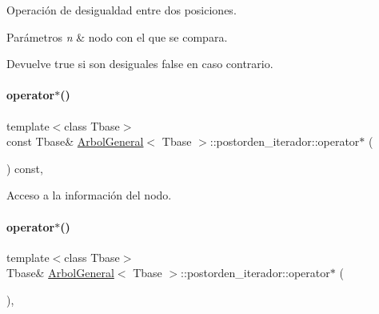 Operación de desigualdad entre dos posiciones. 


\begin{DoxyParams}{Parámetros}
{\em n} & nodo con el que se compara. \\
\hline
\end{DoxyParams}
\begin{DoxyReturn}{Devuelve}
true si son desiguales false en caso contrario. 
\end{DoxyReturn}
\hypertarget{classArbolGeneral_1_1postorden__iterador_aa42543b192361b8ea90e115a0ed99cab}{}\label{classArbolGeneral_1_1postorden__iterador_aa42543b192361b8ea90e115a0ed99cab} 
\paragraph{\texorpdfstring{operator$\ast$()}{operator*()}\hspace{0.1cm}{\footnotesize\ttfamily [1/2]}}
{\footnotesize\ttfamily template$<$class Tbase$>$ \\
const Tbase\& \hyperlink{classArbolGeneral}{Arbol\+General}$<$ Tbase $>$\+::postorden\+\_\+iterador\+::operator$\ast$ (\begin{DoxyParamCaption}{ }\end{DoxyParamCaption}) const\hspace{0.3cm}{\ttfamily [inline]}, {\ttfamily [private]}}



Acceso a la información del nodo. 

\hypertarget{classArbolGeneral_1_1postorden__iterador_af0f0fcc363dd30b5b0d102c1b60817c3}{}\label{classArbolGeneral_1_1postorden__iterador_af0f0fcc363dd30b5b0d102c1b60817c3} 
\paragraph{\texorpdfstring{operator$\ast$()}{operator*()}\hspace{0.1cm}{\footnotesize\ttfamily [2/2]}}
{\footnotesize\ttfamily template$<$class Tbase$>$ \\
Tbase\& \hyperlink{classArbolGeneral}{Arbol\+General}$<$ Tbase $>$\+::postorden\+\_\+iterador\+::operator$\ast$ (\begin{DoxyParamCaption}{ }\end{DoxyParamCaption})\hspace{0.3cm}{\ttfamily [inline]}, {\ttfamily [private]}}

